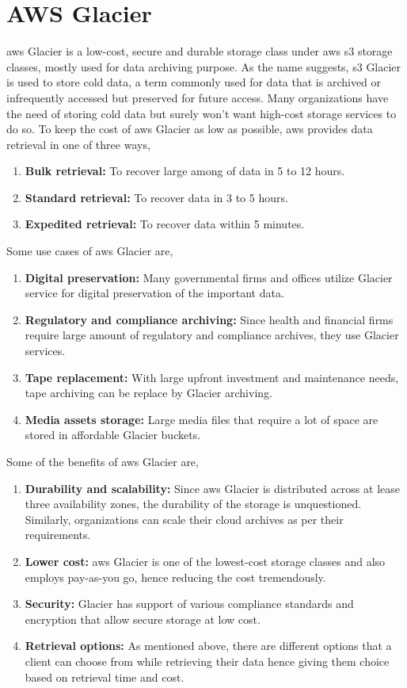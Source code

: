 \documentclass{home_assignment}
\begin{document}
    \section{AWS Glacier}
    \acrshort{aws} Glacier is a low-cost, secure and durable storage class under \acrshort{aws} \acrshort{s3} storage classes, mostly used for data archiving purpose. As the name suggests, \acrshort{s3} Glacier is used to store cold data, a term commonly used for data that is archived or infrequently accessed but preserved for future access. Many organizations have the need of storing cold data but surely won't want high-cost storage services to do so. To keep the cost of \acrshort{aws} Glacier as low as possible, \acrshort{aws} provides data retrieval in one of three ways,
    \begin{enumerate}
        \item \textbf{Bulk retrieval:} To recover large among of data in 5 to 12 hours.
        \item \textbf{Standard retrieval:} To recover data in 3 to 5 hours.
        \item \textbf{Expedited retrieval:} To recover data within 5 minutes.
    \end{enumerate}
    Some use cases of \acrshort{aws} Glacier are,
    \begin{enumerate}
        \item \textbf{Digital preservation:} Many governmental firms and offices utilize Glacier service for digital preservation of the important data.
        \item \textbf{Regulatory and compliance archiving:} Since health and financial firms require large amount of regulatory and compliance archives, they use Glacier services.
        \item \textbf{Tape replacement:} With large upfront investment and maintenance needs, tape archiving can be replace by Glacier archiving.
        \item \textbf{Media assets storage:} Large media files that require a lot of space are stored in affordable Glacier buckets.
    \end{enumerate}
    Some of the benefits of \acrshort{aws} Glacier are,
    \begin{enumerate}
        \item \textbf{Durability and scalability:} Since \acrshort{aws} Glacier is distributed across at lease three availability zones, the durability of the storage is unquestioned. Similarly, organizations can scale their cloud archives as per their requirements.
        \item \textbf{Lower cost:} \acrshort{aws} Glacier is one of the lowest-cost storage classes and also employs pay-as-you go, hence reducing the cost tremendously.
        \item \textbf{Security:} Glacier has support of various compliance standards and encryption that allow secure storage at low cost.
        \item \textbf{Retrieval options:} As mentioned above, there are different options that a client can choose from while retrieving their data hence giving them choice based on retrieval time and cost.
    \end{enumerate}
\end{document}
